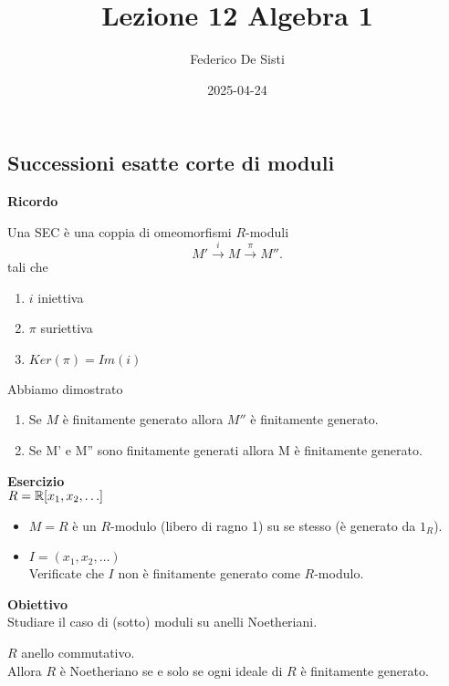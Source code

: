 \documentclass[12px]{article}
\title{Lezione 12 Algebra 1}
\date{2025-04-24}
\author{Federico De Sisti}
\begin{document}
	\maketitle
	\newpage
	\subsection{Successioni esatte corte di moduli}
	\textbf{Ricordo}\\
	\begin{defi}
		Una SEC è una coppia di omeomorfismi $R$-moduli
		\[
			M' \xrightarrow{i} M \xrightarrow{\pi} M''
		.\] 
		tali che 
		\begin{enumerate}
			
			\item $i$ iniettiva
			\item $\pi$ suriettiva
			\item $Ker(\pi) = Im(i)$
		\end{enumerate}
	\end{defi}
	Abbiamo dimostrato
	\begin{enumerate}
		\item Se $M$ è finitamente generato allora  $M''$ è finitamente generato.
		\item Se M' e M'' sono finitamente generati allora M è finitamente generato.
	\end{enumerate}
	\textbf{Esercizio}\\
	$R = \mathbb{R}[x_1,x_2,\ldots]$
	\begin{itemize}
		\item $M = R$ è un $R$-modulo (libero di ragno 1) su se stesso (è generato da $1_R$).
		\item $I  = (x_1,x_2,\ldots)$\\
			Verificate che $I$ non è finitamente generato come $R$-modulo.

	\end{itemize}
	\textbf{Obiettivo}\\
	Studiare  il caso di (sotto) moduli su anelli Noetheriani.
	\begin{lemm}
		$R$ anello commutativo.\\
		Allora $R$ è Noetheriano se e solo se ogni ideale di $R$ è finitamente generato.
	\end{lemm}
\end{document}
